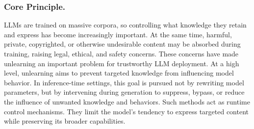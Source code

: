 

\subsubsection{Core Principle.}



LLMs are trained on massive corpora, so controlling what knowledge they retain and express has become increasingly important. At the same time, harmful, private, copyrighted, or otherwise undesirable content may be absorbed during training, raising legal, ethical, and safety concerns. These concerns have made unlearning an important problem for trustworthy LLM deployment. At a high level, unlearning aims to prevent targeted knowledge from influencing model behavior. In inference-time settings, this goal is pursued not by rewriting model parameters, but by intervening during generation to suppress, bypass, or reduce the influence of unwanted knowledge and behaviors. Such methods act as runtime control mechanisms. They limit the model's tendency to express targeted content while preserving its broader capabilities. 

